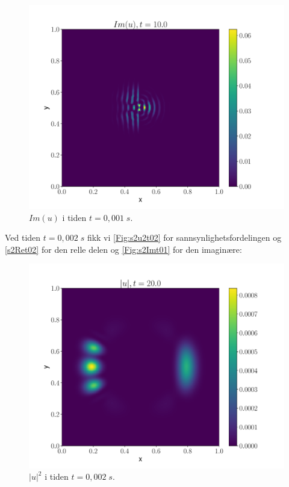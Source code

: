 \documentclass[reprint,english,notitlepage]{revtex4-2}  %
\begin{document}
\begin{figure}[H]
\centering
\includegraphics[scale=0.45, trim={3cm 0 0 0}]{../Images/ImshowIm0001sl1.pdf}
\caption{$Im(u) $ i tiden $t = 0,001 \; s$.}
\label{Fig:s2Imt01}
\end{figure}


Ved tiden $t = 0,002 \; s$ fikk vi \autoref{Fig:s2u2t02} for sannsynlighetsfordelingen og \autoref{s2Ret02} for den relle delen og \autoref{Fig:s2Imt01} for den imaginære:

\begin{figure}[H]
\centering
\includegraphics[scale=0.45, trim={3cm 0 0 0}]{../Images/ImshowUt0002sl1.pdf}
\caption{$|u|^2 $ i tiden $t = 0,002 \; s$.}
\label{Fig:s2u2t02}
\end{figure}
\end{document}
